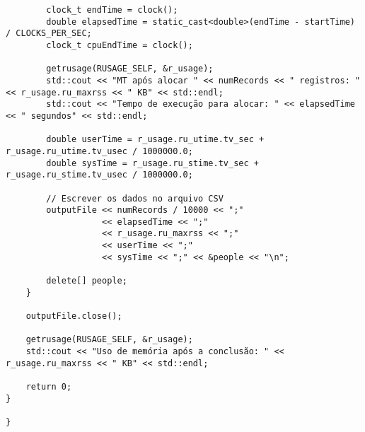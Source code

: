 \documentclass[a2paper,12pt]{article}
\begin{document}
\begin{lstlisting}
        clock_t endTime = clock();
        double elapsedTime = static_cast<double>(endTime - startTime) / CLOCKS_PER_SEC;
        clock_t cpuEndTime = clock();

        getrusage(RUSAGE_SELF, &r_usage);
        std::cout << "MT após alocar " << numRecords << " registros: " << r_usage.ru_maxrss << " KB" << std::endl;
        std::cout << "Tempo de execução para alocar: " << elapsedTime << " segundos" << std::endl;

        double userTime = r_usage.ru_utime.tv_sec + r_usage.ru_utime.tv_usec / 1000000.0;
        double sysTime = r_usage.ru_stime.tv_sec + r_usage.ru_stime.tv_usec / 1000000.0;

        // Escrever os dados no arquivo CSV
        outputFile << numRecords / 10000 << ";"
                   << elapsedTime << ";"
                   << r_usage.ru_maxrss << ";"
                   << userTime << ";"
                   << sysTime << ";" << &people << "\n";

        delete[] people;
    }

    outputFile.close();

    getrusage(RUSAGE_SELF, &r_usage);
    std::cout << "Uso de memória após a conclusão: " << r_usage.ru_maxrss << " KB" << std::endl;

    return 0;
}

}

\end{lstlisting}

\end{document}
